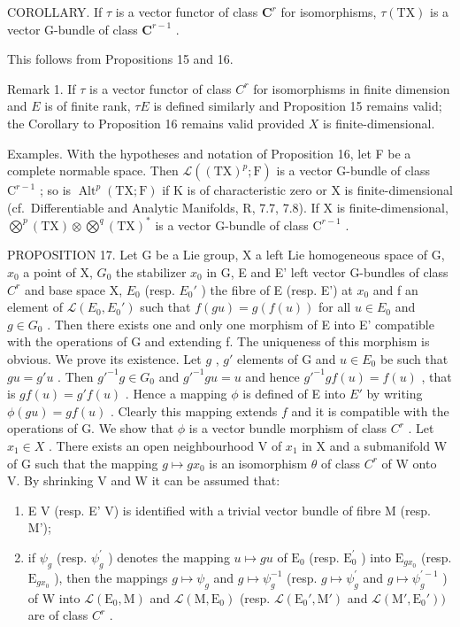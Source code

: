 COROLLARY. If \(\tau\) is a vector functor of class \(\mathbf{C}^r\) for isomorphisms, \(\tau(\mathrm{TX})\) is a vector G-bundle of class \(\mathbf{C}^{r-1}\) .

This follows from Propositions 15 and 16.

Remark 1. If \(\tau\) is a vector functor of class \(C^r\) for isomorphisms in finite dimension and \(E\) is of finite rank, \(\tau E\) is defined similarly and Proposition 15 remains valid; the Corollary to Proposition 16 remains valid provided \(X\) is finite-dimensional.

Examples. With the hypotheses and notation of Proposition 16, let F be a complete normable space. Then \(\mathcal{L}((\mathrm{TX})^p; \mathrm{F})\) is a vector G-bundle of class \(\mathrm{C}^{r-1}\) ; so is \(\operatorname{Alt}^p(\mathrm{TX}; \mathrm{F})\) if K is of characteristic zero or X is finite-dimensional (cf.~Differentiable and Analytic Manifolds, R, 7.7, 7.8). If X is finite-dimensional, \(\bigotimes^p(\mathrm{TX}) \otimes \bigotimes^q(\mathrm{TX})^*\) is a vector G-bundle of class \(\mathrm{C}^{r-1}\) .

PROPOSITION 17. Let G be a Lie group, X a left Lie homogeneous space of G, \(x_0\) a point of X, \(G_0\) the stabilizer \(x_0\) in G, E and E' left vector G-bundles of class \(C^{r}\) and base space X, \(E_0\) (resp. \(E_0'\) ) the fibre of E (resp. E') at \(x_0\) and f an element of \(\mathcal{L}(E_0, E_0')\) such that \(f(gu) = g(f(u))\) for all \(u \in E_0\) and \(g \in G_0\) . Then there exists one and only one morphism of E into E' compatible with the operations of G and extending f. The uniqueness of this morphism is obvious. We prove its existence. Let \(g\) , \(g'\) elements of G and \(u \in E_0\) be such that \(gu = g'u\) . Then \(g'^{-1}g \in G_0\) and \(g'^{-1}gu = u\) and hence \(g'^{-1}gf(u) = f(u)\) , that is \(gf(u) = g'f(u)\) . Hence a mapping \(\phi\) is defined of E into \(E'\) by writing \(\phi(gu) = gf(u)\) . Clearly this mapping extends \(f\) and it is compatible with the operations of G. We show that \(\phi\) is a vector bundle morphism of class \(C^r\) . Let \(x_1 \in X\) . There exists an open neighbourhood V of \(x_1\) in X and a submanifold W of G such that the mapping \(g \mapsto gx_0\) is an isomorphism \(\theta\) of class \(C^r\) of W onto V. By shrinking V and W it can be assumed that:

\begin{enumerate}
\def\labelenumi{(\arabic{enumi})}
\item
  E \textbar{} V (resp. E' \textbar{} V) is identified with a trivial vector bundle of fibre M (resp. M');
\item
  if \(\psi_{g}\) (resp. \(\psi_{g}^{\prime}\) ) denotes the mapping \(u\mapsto gu\) of \(\mathrm{E}_0\) (resp. \(\mathrm{E}_0^{\prime}\) ) into \(\mathrm{E}_{gx_0}\) (resp. \(\mathrm{E}_{gx_0}\) ), then the mappings \(g\mapsto \psi_g\) and \(g\mapsto \psi_g^{-1}\) (resp. \(g\mapsto \psi_g^{\prime}\) and \(g\mapsto \psi_g^{\prime -1}\) ) of W into \(\mathcal{L}(\mathrm{E}_0,\mathrm{M})\) and \(\mathcal{L}(\mathrm{M},\mathrm{E}_0)\) (resp. \(\mathcal{L}(\mathrm{E}_0',\mathrm{M}')\) and \(\mathcal{L}(\mathrm{M}',\mathrm{E}_0'))\) are of class \(C^r\) .
\end{enumerate}

